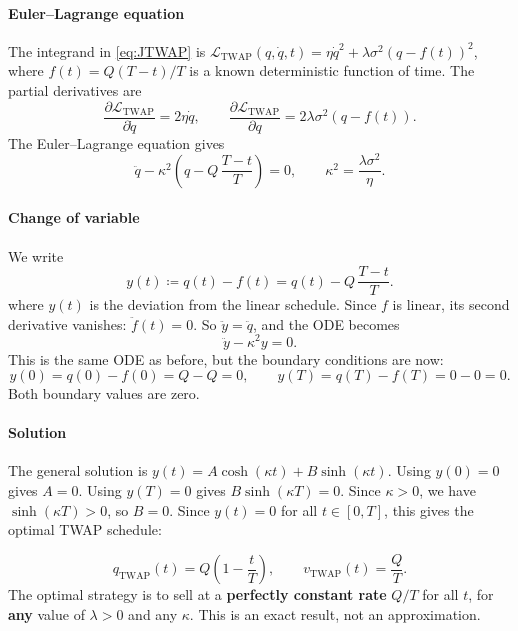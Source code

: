 \documentclass[12pt, a4paper]{article}
\newcommand{\kap}{\kappa}
\begin{document}
\paragraph{Euler--Lagrange equation}

The integrand in \eqref{eq:JTWAP} is $\mathcal{L}_{\mathrm{TWAP}}(q,\dot q, t) = \eta\dot q^2 + \lambda\sigma^2(q - f(t))^2$,
where $f(t) = Q(T-t)/T$ is a known deterministic function of time.
The partial derivatives are
\[
  \frac{\partial\mathcal{L}_{\mathrm{TWAP}}}{\partial\dot q} = 2\eta\dot q,
  \qquad
  \frac{\partial\mathcal{L}_{\mathrm{TWAP}}}{\partial q} = 2\lambda\sigma^2(q - f(t)).
\]
The Euler--Lagrange equation gives
\[
  \ddot q - \kap^2\!\left(q - Q\,\frac{T-t}{T}\right) = 0, \qquad \kap^2 = \frac{\lambda\sigma^2}{\eta}.
\]

\paragraph{Change of variable}

We write
\[
  y(t) \coloneqq q(t) - f(t) = q(t) - Q\,\frac{T-t}{T}.
\]
where $y(t)$ is the deviation from the linear schedule.
Since $f$ is linear, its second derivative vanishes: $\ddot f(t) = 0$.
So $\ddot y = \ddot q$, and the ODE becomes
\[
  \ddot y - \kap^2 y = 0.
\]
This is the same ODE as before, but the boundary conditions are now:
\[
  y(0) = q(0) - f(0) = Q - Q = 0, \qquad y(T) = q(T) - f(T) = 0 - 0 = 0.
\]
Both boundary values are zero.

\paragraph{Solution}

The general solution is $y(t) = A\cosh(\kap t) + B\sinh(\kap t)$.
Using $y(0) = 0$ gives $A = 0$.
Using $y(T) = 0$ gives $B\sinh(\kap T) = 0$.
Since $\kap > 0$, we have $\sinh(\kap T) > 0$, so $B = 0$.
Since $y(t) = 0$ for all $t \in [0, T]$, this gives the optimal TWAP schedule:

\begin{resultbox}
\[
  q_{\mathrm{TWAP}}(t) = Q\!\left(1 - \frac{t}{T}\right),
  \qquad
  v_{\mathrm{TWAP}}(t) = \frac{Q}{T}.
\]
The optimal strategy is to sell at a \textbf{perfectly constant rate} $Q/T$
for all $t$, for \textbf{any} value of $\lambda > 0$ and any $\kap$.
This is an exact result, not an approximation.
\end{resultbox}

\end{document}

